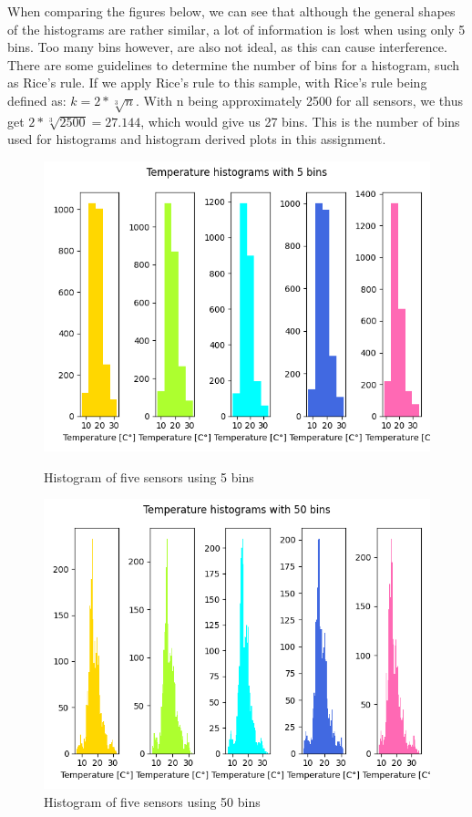 \documentclass[a4paper,12pt]{article} %
\begin{document}
\begin{enumerate}
When comparing the figures below, we can see that although the general shapes of the histograms are rather similar, a lot of information is lost when using only 5 bins. Too many bins however, are also not ideal, as this can cause interference. There are some guidelines to determine the number of bins for a histogram, such as Rice's rule. If we apply Rice's rule to this sample, with Rice's rule being defined as: $k = 2 * \sqrt[3]{n}$. With n being approximately 2500 for all sensors, we thus get $2* \sqrt[3]{2500} = 27.144$, which would give us 27 bins. This is the number of bins used for histograms and histogram derived plots in this assignment.

\begin{figure}[H]
  \centering
  \begin{minipage}[b]{0.45\textwidth}
    \includegraphics[width=\textwidth]{plot_temps_hist_5.png}
    \caption{Histogram of five sensors using 5 bins}
  \end{minipage}
  \hfill
  \begin{minipage}[b]{0.45\textwidth}
    \includegraphics[width=\textwidth]{plot_temps_hist_50.png}
    \caption{Histogram of five sensors using 50 bins}
  \end{minipage}
\end{figure}


\end{enumerate}
\end{document}
